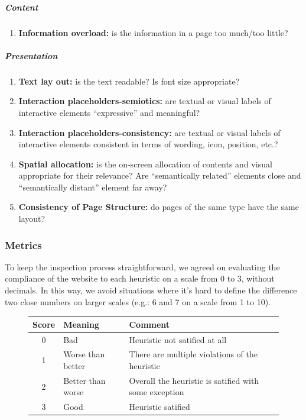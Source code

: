\subparagraph*{Content}

\begin{enumerate}[start=1,label={\bf MC\arabic{*}}]
    \item \textbf{Information overload:} is the information in a page too much/too
          little?
\end{enumerate}

\subparagraph*{Presentation}

\begin{enumerate}[start=1,label={\bf MP\arabic{*}}]
    \item \textbf{Text lay out:} is the text readable? Is font size appropriate?
    \item \textbf{Interaction placeholders-semiotics:} are textual or visual    
          labels of interactive elements ``expressive'' and meaningful?
    \item \textbf{Interaction placeholders-consistency:} are textual or visual 
          labels of interactive elements consistent in terms of wording, icon, 
          position, etc.?
    \item \textbf{Spatial allocation:} is the on-screen allocation of contents 
          and visual appropriate for their relevance? Are ``semantically 
          related'' elements close and ``semantically distant'' element far 
          away?
    \item \textbf{Consistency of Page Structure:} do pages of the same type 
          have the same layout?
\end{enumerate}

\subsubsection{Metrics}

To keep the inspection process straightforward, we agreed on evaluating the compliance of the website to each heuristic on a scale from 0 to 3, without decimals. In this way, we avoid situations where it's hard to define the difference two close numbers on larger scales (e.g.: 6 and 7 on a scale from 1 to 10).

\begin{figure}[h]
    \begin{tabular}{c l l}
        \toprule
        \textbf{Score} & \textbf{Meaning} & \textbf{Comment} \\
        \midrule
        0 & Bad & Heuristic not satified at all \\
        1 & Worse than better & There are multiple violations of the heuristic \\
        2 & Better than worse & Overall the heuristic is satified with some  exception \\
        3 & Good & Heuristic satified\\
        \bottomrule
    \end{tabular}
\end{figure}

